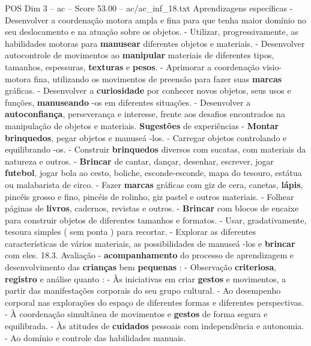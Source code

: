 \begin{textsample}{POS Dim 3 – ac – Score 53.00 – ac/ac\_inf\_18.txt}
Aprendizagens específicas - Desenvolver a coordenação motora ampla e fina para que tenha maior domínio no seu deslocamento e na atuação sobre os objetos. - Utilizar, progressivamente, as habilidades motoras para \textbf{manusear} diferentes objetos e materiais. - Desenvolver autocontrole de movimentos ao \textbf{manipular} materiais de diferentes tipos, tamanhos, espessuras, \textbf{texturas} e \textbf{pesos}. - Aprimorar a coordenação visio-motora fina, utilizando os movimentos de preensão para fazer suas \textbf{marcas} gráficas. - Desenvolver a \textbf{curiosidade} por conhecer novos objetos, seus usos e funções, \textbf{manuseando} -os em diferentes situações. - Desenvolver a \textbf{autoconfiança}, perseverança e interesse, frente aos desafios encontrados na manipulação de objetos e materiais. \textbf{Sugestões} de experiências - \textbf{Montar} \textbf{brinquedos}, pegar objetos e manuseá -los. - Carregar objetos controlando e equilibrando -os. - Construir \textbf{brinquedos} diversos com sucatas, com materiais da natureza e outros. - \textbf{Brincar} de cantar, dançar, desenhar, escrever, jogar \textbf{futebol}, jogar bola ao cesto, boliche, esconde-esconde, mapa do tesouro, estátua ou malabarista de circo. - Fazer \textbf{marcas} gráficas com giz de cera, canetas, \textbf{lápis}, pincéis grosso e fino, pincéis de rolinho, giz pastel e outros materiais. - Folhear páginas de \textbf{livros}, cadernos, revistas e outros. - \textbf{Brincar} com blocos de encaixe para construir objetos de diferentes tamanhos e formatos. - Usar, gradativamente, tesoura simples ( sem ponta ) para recortar. - Explorar as diferentes características de vários materiais, as possibilidades de manuseá -los e \textbf{brincar} com eles. 18.3.
Avaliação - \textbf{acompanhamento} do processo de aprendizagem e desenvolvimento das \textbf{crianças} bem \textbf{pequenas} : - Observação \textbf{criteriosa}, \textbf{registro} e análise quanto : - Às iniciativas em criar \textbf{gestos} e movimentos, a partir das manifestações corporais do seu grupo cultural. - Ao desempenho corporal nas explorações do espaço de diferentes formas e diferentes perspectivas. - À coordenação simultânea de movimentos e \textbf{gestos} de forma segura e equilibrada. - Às atitudes de \textbf{cuidados} pessoais com independência e autonomia. - Ao domínio e controle das habilidades manuais.

\end{textsample}
